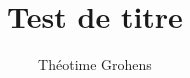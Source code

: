 \documentclass[a4paper,twoside]{memoir}
\begin{document}
\frontmatter

\author{Théotime Grohens}
\title{Test de titre}

\maketitle

\pagebreak

\tableofcontents
\listoffigures

\mainmatter


\end{document}
